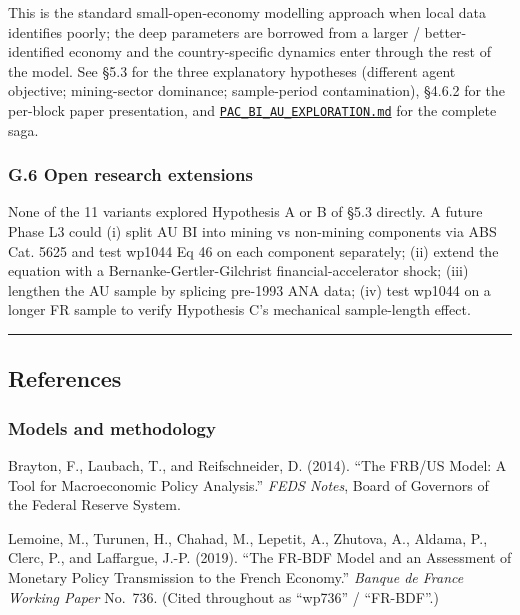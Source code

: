 \documentclass[
]{article}
\begin{document}
This is the standard small-open-economy modelling approach when local
data identifies poorly; the deep parameters are borrowed from a larger /
better-identified economy and the country-specific dynamics enter
through the rest of the model. See §5.3 for the three explanatory
hypotheses (different agent objective; mining-sector dominance;
sample-period contamination), §4.6.2 for the per-block paper
presentation, and
\href{../PAC_BI_AU_EXPLORATION.md}{\texttt{PAC\_BI\_AU\_EXPLORATION.md}}
for the complete saga.

\subsubsection{G.6 Open research
extensions}\label{g.6-open-research-extensions}

None of the 11 variants explored Hypothesis A or B of §5.3 directly. A
future Phase L3 could (i) split AU BI into mining vs non-mining
components via ABS Cat. 5625 and test wp1044 Eq 46 on each component
separately; (ii) extend the equation with a Bernanke-Gertler-Gilchrist
financial-accelerator shock; (iii) lengthen the AU sample by splicing
pre-1993 ANA data; (iv) test wp1044 on a longer FR sample to verify
Hypothesis C's mechanical sample-length effect.

\begin{center}\rule{0.5\linewidth}{0.5pt}\end{center}

\subsection{References}\label{references}

\subsubsection{Models and methodology}\label{models-and-methodology}

Brayton, F., Laubach, T., and Reifschneider, D. (2014). ``The FRB/US
Model: A Tool for Macroeconomic Policy Analysis.'' \emph{FEDS Notes},
Board of Governors of the Federal Reserve System.

Lemoine, M., Turunen, H., Chahad, M., Lepetit, A., Zhutova, A., Aldama,
P., Clerc, P., and Laffargue, J.-P. (2019). ``The FR-BDF Model and an
Assessment of Monetary Policy Transmission to the French Economy.''
\emph{Banque de France Working Paper} No.~736. (Cited throughout as
``wp736'' / ``FR-BDF''.)
\end{document}
